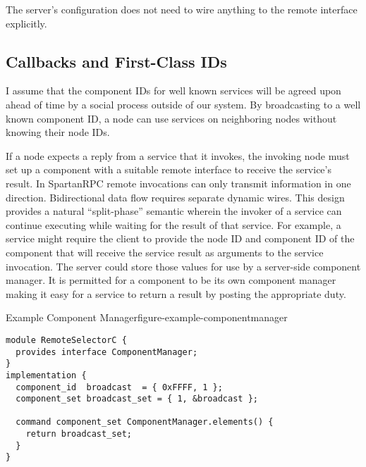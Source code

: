 The server's configuration does not need to wire anything to the remote interface explicitly.

\subsection{Callbacks and First-Class IDs}

I assume that the component IDs for well known services will be agreed upon ahead of time by a
social process outside of our system. By broadcasting to a well known component ID, a node can
use services on neighboring nodes without knowing their node IDs.

If a node expects a reply from a service that it invokes, the invoking node must set up a
component with a suitable remote interface to receive the service's result. In SpartanRPC remote
invocations can only transmit information in one direction. Bidirectional data flow requires
separate dynamic wires. This design provides a natural ``split-phase'' semantic wherein the
invoker of a service can continue executing while waiting for the result of that service. For
example, a service might require the client to provide the node ID and component ID of the
component that will receive the service result as arguments to the service invocation. The
server could store those values for use by a server-side component manager. It is permitted for
a component to be its own component manager making it easy for a service to return a result by
posting the appropriate duty.

\begin{fpfig}[t]{Example Component Manager}{figure-example-componentmanager}
{
\singlespace
\begin{lstlisting}
module RemoteSelectorC {
  provides interface ComponentManager;
}
implementation {
  component_id  broadcast  = { 0xFFFF, 1 };
  component_set broadcast_set = { 1, &broadcast };

  command component_set ComponentManager.elements() {
    return broadcast_set;
  }
}
\end{lstlisting}
\primaryspacing
}
\end{fpfig}

%

